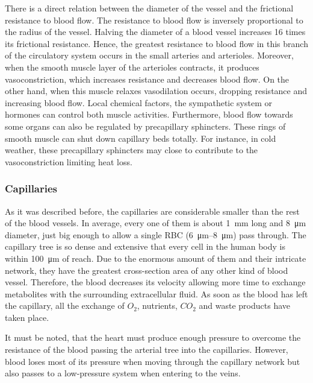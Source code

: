 There is a direct relation between the diameter of the vessel and the frictional resistance to blood flow. The resistance to blood flow is inversely proportional to the radius of the vessel. Halving the diameter of a blood vessel increases 16 times its frictional resistance. Hence, the greatest resistance to blood flow in this branch of the circulatory system occurs in the small arteries and arterioles. Moreover, when the smooth muscle layer of the arterioles contracts, it produces vasoconstriction, which increases resistance and decreases blood flow. On the other hand, when this muscle relaxes vasodilation occurs, dropping resistance and increasing blood flow. Local chemical factors, the sympathetic system or hormones can control both muscle activities. Furthermore, blood flow towards some organs can also be regulated by precapillary sphincters. These rings of smooth muscle can shut down capillary beds totally. For instance, in cold weather, these precapillary sphincters may close to contribute to the vasoconstriction limiting heat loss.  

\subsubsection{Capillaries}
As it was described before, the capillaries are considerable smaller than the rest of the blood vessels. In average, every one of them is about \SI{1}{\milli\meter} long and \SI{8}{\micro\meter} diameter, just big enough to allow a single RBC (\SIrange{6}{8}{\micro\meter}) pass through. The capillary tree is so dense and extensive that every cell in the human body is within \SI{100}{\micro\meter} of reach.  Due to the enormous amount of them and their intricate network,  they have the greatest cross-section area of any other kind of blood vessel. Therefore, the blood decreases its velocity allowing more time to exchange metabolites with the surrounding extracellular fluid. As soon as the blood has left the capillary, all the exchange of $O_2$, nutrients, $CO_2$ and waste products have taken place. 

It must be noted, that the heart must produce enough pressure to overcome the resistance of the blood passing the arterial tree into the capillaries. However, blood loses most of its pressure when moving through the capillary network but also passes to a low-pressure system when entering to the veins. 

